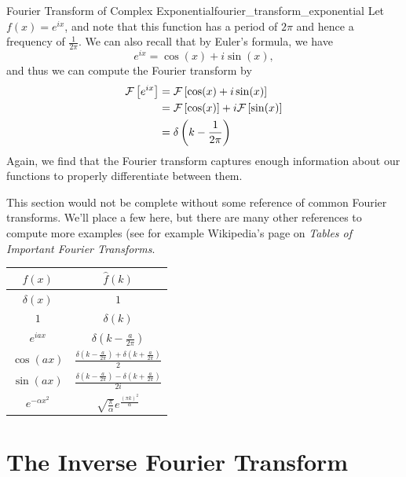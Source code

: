 \begin{ex}{Fourier Transform of Complex Exponential}{fourier_transform_exponential}
	Let $f(x)= e^{ix}$, and note that this function has a period of $2\pi$ and hence a frequency of $\frac{1}{2\pi}$.  We can also recall that by Euler's formula, we have
	\[
	e^{ix} = \cos(x)+i\sin(x),
	\]
	and thus we can compute the Fourier transform by
	\begin{align*}
		\mathcal{F}\left[ e^{ix} \right] &= \mathcal{F}\left[ \cos(x)+i\sin(x) \right]\\
		&= \mathcal{F}\left[ \cos(x) \right]+i\mathcal{F}\left[ \sin(x) \right]\\
		&= \delta\left(k-\frac{1}{2\pi}\right)
	\end{align*}
	Again, we find that the Fourier transform captures enough information about our functions to properly differentiate between them.  
\end{ex}

This section would not be complete without some reference of common Fourier transforms.  We'll place a few here, but there are many other references to compute more examples (see for example Wikipedia's page on \emph{Tables of Important Fourier Transforms}.

\begin{table}[H]
        \centering
        \renewcommand{\arraystretch}{2}
        \begin{tabular}{c|c}
            $f(x)$ & $\hat{f}(k)$\\
            \hline
         	$\delta(x)$ & $1$\\
         	$1$ & $\delta(k)$\\
         	$e^{iax}$ & $\delta\left(k-\frac{a}{2\pi}\right)$\\
         	$\cos(ax)$ & $\frac{\delta\left(k-\frac{a}{2\pi}\right)+\delta\left(k+\frac{a}{2\pi}\right)}{2}$\\
     		$\sin(ax)$ & $\frac{\delta\left(k-\frac{a}{2\pi}\right)-\delta\left(k+\frac{a}{2\pi}\right)}{2i}$\\
     		$e^{-\alpha x^2}$ & $\sqrt{\frac{\pi}{\alpha}} e^{\frac{(\pi k)^2}{\alpha}}$
        \end{tabular}
        \label{tab:fourier_transform}
    \end{table}
    
\section{The Inverse Fourier Transform}

